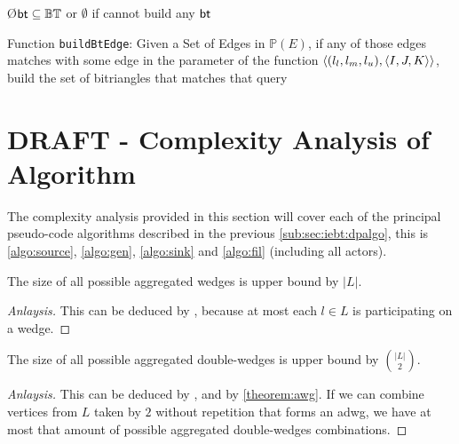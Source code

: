 \begin{algorithm}[h!]
\SetAlgoRefName{[A10]}
\O{$\mathsf{bt} \subseteq \mathbb{BT}$ or $\emptyset$ if cannot build any $\mathsf{bt}$}
\caption[Function \texttt{buildBtEdge}]{Function \texttt{buildBtEdge}: Given a Set of Edges in $\mathbb{P}(E)$, if any of those edges matches with some edge in the parameter of the function $\left\langle (l_l, l_m, l_u), \left\langle I,J,K \right\rangle \right\rangle$, build the set of bitriangles that matches that query}
\label{algo:buildBtEdge}
\end{algorithm}

\iffalse
\clearpage
\section{DRAFT - Complexity Analysis of Algorithm}
The complexity analysis provided in this section will cover each of the principal pseudo-code algorithms described in the previous \autoref{sub:sec:iebt:dpalgo}, this is \autoref{algo:source}, \autoref{algo:gen}, \autoref{algo:sink} and \autoref{algo:fil} (including all actors). 

\begin{theorem}[$|\aw| \leq |L|$]\label{theorem:awg}
The size of all possible aggregated wedges is upper bound by $|L|$.
\end{theorem}
\begin{proof}[Anlaysis]
This can be deduced by , because at most each $l \in L$ is participating on a wedge.
\end{proof}

\begin{theorem}\label{theorem:adwg}
The size of all possible aggregated double-wedges is upper bound by $\binom{|L|}{2}$.
\end{theorem}
\begin{proof}[Anlaysis]
This can be deduced by , and by \autoref{theorem:awg}. If we can combine vertices from $L$ taken by $2$ without repetition that forms an \acrshort{adwg}, we have at most that amount of possible aggregated double-wedges combinations.
\end{proof}
      
